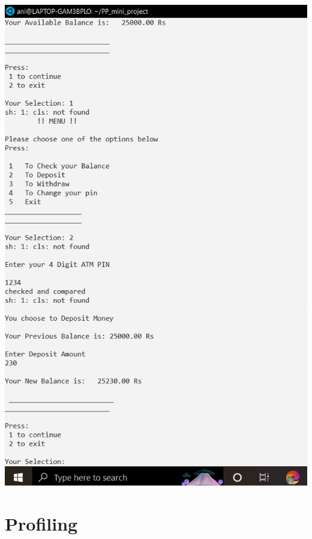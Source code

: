 \documentclass{article}
\begin{document}
\includegraphics[scale=0.35]{output_c_2.png} \\

\section{Profiling}
\end{document}

